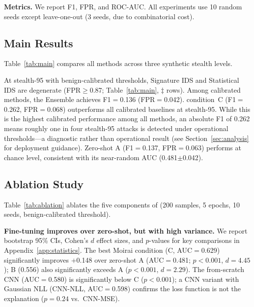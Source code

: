 \textbf{Metrics.}
We report F1, FPR, and ROC-AUC.  All experiments use 10 random seeds
except leave-one-out (3 seeds, due to combinatorial cost).

\subsection{Main Results}
\label{sec:experiments:main}

Table~\ref{tab:main} compares all methods across three synthetic stealth levels.



At stealth-95 with benign-calibrated thresholds, Signature IDS and
Statistical IDS are degenerate (FPR$\geq$0.87; Table~\ref{tab:main},
$\ddagger$ rows).  Among calibrated methods, the Ensemble achieves
F1$=$0.136 (FPR$=$0.042).
\ours{} condition~C (F1$=$0.262, FPR$=$0.068) outperforms all calibrated
baselines at stealth-95.
While this is the highest calibrated performance among all methods,
an absolute F1 of 0.262 means roughly one in four stealth-95 attacks
is detected under operational thresholds---a diagnostic rather than
operational result (see Section~\ref{sec:analysis} for deployment guidance).
Zero-shot A (F1$=$0.137, FPR$=$0.063) performs at chance level, consistent
with its near-random AUC (0.481$\pm$0.042).

\subsection{Ablation Study}
\label{sec:experiments:ablation}

Table~\ref{tab:ablation} ablates the five components of \ours{} (200
samples, 5 epochs, 10 seeds, benign-calibrated threshold).



\textbf{Fine-tuning improves over zero-shot, but with high variance.}
We report bootstrap 95\% CIs, Cohen's $d$ effect sizes, and $p$-values for
key comparisons in Appendix~\ref{app:statistics}.
The best Moirai condition (C, AUC$=$0.629) significantly improves $+$0.148
over zero-shot A (AUC$=$0.481; $p{<}0.001$, $d{=}4.45$);
B (0.556) also significantly exceeds A ($p{<}0.001$, $d{=}2.29$).
The from-scratch CNN (AUC$=$0.580) is significantly below C ($p{<}0.001$);
a CNN variant with Gaussian NLL (CNN-NLL, AUC$=$0.598) confirms the
loss function is not the explanation ($p{=}0.24$ vs.\ CNN-MSE).


